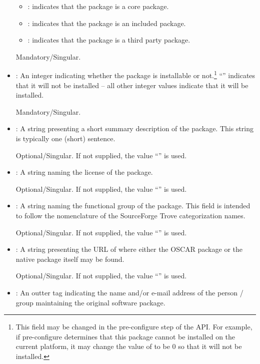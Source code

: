 \begin{itemize}
  \begin{itemize}
  \item {}: indicates that the package is a core package.
  \item {}: indicates that the package is an included
    package.
  \item {}: indicates that the package is a third
    party package.
  \end{itemize}

  Mandatory/Singular.
  
\item {}: An integer indicating whether the package
  is installable or not.\footnote{This field may be changed in the
    pre-configure step of the API.  For example, if pre-configure
    determines that this package cannot be installed on the current
    platform, it may change the value of  to be 0
    so that it will not be installed.}  ``'' indicates that
  it will not be installed -- all other integer values indicate that
  it will be installed.
  
  Mandatory/Singular.
  
\item {}: A string presenting a short summary
  description of the package.  This string is typically one (short)
  sentence.
  
  Optional/Singular.  If not supplied, the value
  ``'' is used.

\item {}: A string naming the license of the package.
  
  Optional/Singular.  If not supplied, the value
  ``'' is used.

\item {}: A string naming the functional group of the
  package.  This field is intended to follow the nomenclature of the
  SourceForge Trove categorization names.
  
  Optional/Singular.  If not supplied, the value
  ``'' is used.
  
\item {}: A string presenting the URL of where either the
  OSCAR package or the native package itself may be found.
  
  Optional/Singular.  If not supplied, the value
  ``'' is used.

\item {}: An outter tag indicating the name and/or
  e-mail address of the person / group maintaining the original
  software package.


\end{itemize}
